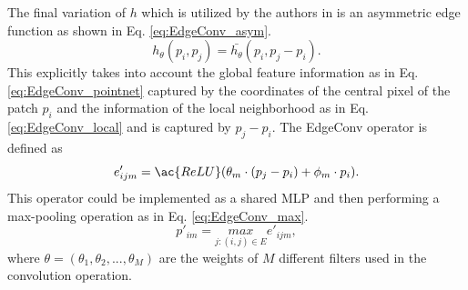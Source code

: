 The final variation of $h$ which is utilized by the authors in \cite{wang2019dynamic} is an asymmetric edge function as shown in Eq. \ref{eq:EdgeConv_asym}.
\begin{equation}
    \label{eq:EdgeConv_asym}
    h_{\theta}(p_i, p_j) = \bar{h_{\theta}}(p_i, p_j-p_i).
\end{equation}
This explicitly takes into account the global feature information as in Eq.\ref{eq:EdgeConv_pointnet} captured by the coordinates of the central pixel of the patch $p_i$ and the information of the local neighborhood as in Eq. \ref{eq:EdgeConv_local} and is captured by $p_j-p_i$. The EdgeConv operator is defined as 
\begin{equation}
    \label{eq:EdgeConv_op}
    e'_{ijm} = \ac{ReLU}(\theta _m \cdot (p_j - p_i) + \phi _m \cdot p_i).
\end{equation}
This operator could be implemented as a shared \ac{MLP} and then performing a max-pooling operation as in Eq. \ref{eq:EdgeConv_max}.
\begin{equation}
    \label{eq:EdgeConv_max}
    p'_{im} = \underset{j:(i,j) \in E}{max}e'_{ijm},
\end{equation}
where $\theta = (\theta _1, \theta _2, ... , \theta _M)$ are the weights of $M$ different filters used in the convolution operation.

\vspace{5mm}


